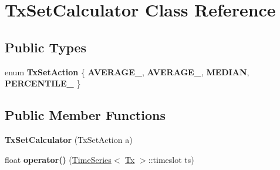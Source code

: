 \hypertarget{class_tx_set_calculator}{}\section{Tx\+Set\+Calculator Class Reference}
\label{class_tx_set_calculator}
\subsection*{Public Types}
\begin{DoxyCompactItemize}
\item 
\mbox{\label{class_tx_set_calculator_ac29c8f0e71e8b4e57467de3fc67bb23c}} 
enum {\bfseries Tx\+Set\+Action} \{ {\bfseries A\+V\+E\+R\+A\+G\+E\+\_}, 
{\bfseries A\+V\+E\+R\+A\+G\+E\+\_}, 
{\bfseries M\+E\+D\+I\+AN}, 
{\bfseries P\+E\+R\+C\+E\+N\+T\+I\+L\+E\+\_}
 \}
\end{DoxyCompactItemize}
\subsection*{Public Member Functions}
\begin{DoxyCompactItemize}
\item 
\mbox{\label{class_tx_set_calculator_a544193567f9aa13b8195af327917cb68}} 
{\bfseries Tx\+Set\+Calculator} (Tx\+Set\+Action a)
\item 
\mbox{\label{class_tx_set_calculator_a0828f3595e08855564e19f2bd5887c20}} 
float {\bfseries operator()} (\mbox{\hyperlink{class_time_series}{Time\+Series}}$<$ \mbox{\hyperlink{struct_tx}{Tx}} $>$\+::timeslot ts)
\end{DoxyCompactItemize}
